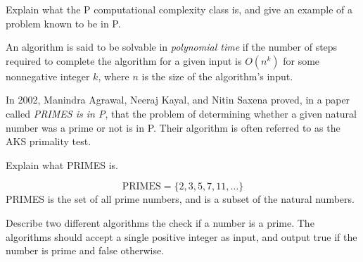 \documentclass[addpoints,12pt]{exam}
\begin{document}
\begin{questions}
\begin{solution}
\end{solution}


\question
  Explain what the P computational complexity class is, and give an example of a problem known to be in P.
  \begin{solution}
    An algorithm is said to be solvable in \emph{polynomial time} if the number of steps required to complete the algorithm for a given input is $O(n^k)$ for some nonnegative integer $k$, where $n$ is the size of the algorithm's input.

    In 2002, Manindra Agrawal, Neeraj Kayal, and Nitin Saxena proved, in a paper called \emph{PRIMES is in P}, that the problem of determining whether a given natural number was a prime or not is in P.
    Their algorithm is often referred to as the AKS primality test.
  \end{solution}



\question
Explain what PRIMES is.
\begin{solution}
  \[ \textrm{PRIMES} = \{2, 3, 5, 7, 11, \ldots \} \]
  PRIMES is the set of all prime numbers, and is a subset of the natural numbers.
\end{solution}


\question
  Describe two different algorithms the check if a number is a prime.
  The algorithms should accept a single positive integer as input, and output true if the number is prime and false otherwise.


\end{questions}
\end{document}
